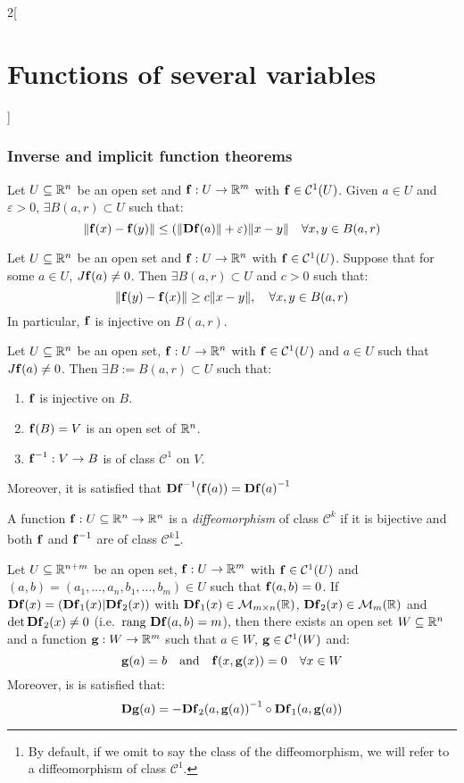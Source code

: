 \documentclass[../../../main_math.tex]{subfiles}
\begin{document}
\begin{multicols}{2}[\section{Functions of several variables}]
  \subsubsection{Inverse and implicit function theorems}
  \begin{lemma}
    Let $U\subseteq\mathbb{R}^n$ be an open set and $\boldsymbol{\mathrm{f}}:U\rightarrow\mathbb{R}^m$ with $\boldsymbol{\mathrm{f}}\in \mathcal{C}^1(U)$. Given $a\in U$ and $\varepsilon>0$, $\exists B(a,r)\subset U$ such that: $$\|\boldsymbol{\mathrm{f}}(x)-\boldsymbol{\mathrm{f}}(y)\|\leq(\|\boldsymbol{\mathrm{Df}}(a)\|+\varepsilon)\|x-y\|\quad\forall x,y\in B(a,r)$$
  \end{lemma}
  \begin{lemma}
    Let $U\subseteq\mathbb{R}^n$ be an open set and $\boldsymbol{\mathrm{f}}:U\rightarrow\mathbb{R}^n$ with $\boldsymbol{\mathrm{f}}\in \mathcal{C}^1(U)$. Suppose that for some $a\in U$, $J\boldsymbol{\mathrm{f}}(a)\ne 0$. Then $\exists B(a,r)\subset U$ and $c>0$ such that: $$\|\boldsymbol{\mathrm{f}}(y)-\boldsymbol{\mathrm{f}}(x)\|\geq c\|x-y\|,\quad\forall x,y\in B(a,r)$$ In particular, $\boldsymbol{\mathrm{f}}$ is injective on $B(a,r)$.
  \end{lemma}
  \begin{theorem}
    Let $U\subseteq\mathbb{R}^n$ be an open set, $\boldsymbol{\mathrm{f}}:U\rightarrow\mathbb{R}^n$ with $\boldsymbol{\mathrm{f}}\in \mathcal{C}^1(U)$ and $a\in U$ such that $J\boldsymbol{\mathrm{f}}(a)\ne0$. Then $\exists B:=B(a,r)\subset U$ such that:
    \begin{enumerate}
      \item $\boldsymbol{\mathrm{f}}$ is injective on $B$.
      \item $\boldsymbol{\mathrm{f}}(B)=V$ is an open set of $\mathbb{R}^n$.
      \item $\boldsymbol{\mathrm{f}}^{-1}:V\rightarrow B$ is of class $\mathcal{C}^1$ on $V$.
    \end{enumerate} Moreover, it is satisfied that $\boldsymbol{\mathrm{D}}{\boldsymbol{\mathrm{f}}}^{-1}(\boldsymbol{\mathrm{f}}(a))={\boldsymbol{\mathrm{Df}}(a)}^{-1}$
  \end{theorem}
  \begin{definition}
    A function $\boldsymbol{\mathrm{f}}:U\subseteq\mathbb{R}^n\rightarrow\mathbb{R}^n$ is a \emph{diffeomorphism} of class $\mathcal{C}^k$ if it is bijective and both $\boldsymbol{\mathrm{f}}$ and $\boldsymbol{\mathrm{f}}^{-1}$ are of class $\mathcal{C}^k$\footnote{By default, if we omit to say the class of the diffeomorphism, we will refer to a diffeomorphism of class $\mathcal{C}^1$.}.
  \end{definition}
  \begin{theorem}
    Let $U\subseteq\mathbb{R}^{n+m}$ be an open set, $\boldsymbol{\mathrm{f}}:U\rightarrow\mathbb{R}^m$ with $\boldsymbol{\mathrm{f}}\in \mathcal{C}^1(U)$ and $(a,b)=(a_1,\ldots,a_n,b_1,\ldots,b_m)\in U$ such that $\boldsymbol{\mathrm{f}}(a,b)=0$. If $\boldsymbol{\mathrm{D}}\boldsymbol{\mathrm{f}}(x)=(\boldsymbol{\mathrm{D}}\boldsymbol{\mathrm{f}}_1(x)|\boldsymbol{\mathrm{D}}\boldsymbol{\mathrm{f}}_2(x))$ with $\boldsymbol{\mathrm{D}}\boldsymbol{\mathrm{f}}_1(x)\in\mathcal{M}_{m\times n}(\mathbb{R} )$, $\boldsymbol{\mathrm{D}}\boldsymbol{\mathrm{f}}_2(x)\in\mathcal{M}_m(\mathbb{R} )$ and $\det \boldsymbol{\mathrm{Df}}_2(x)\ne 0$ (i.e.\ $\text{rang }\boldsymbol{\mathrm{Df}}(a,b)=m$), then there exists an open set $W\subseteq\mathbb{R}^n$ and a function $\boldsymbol{\mathrm{g}}:W\rightarrow\mathbb{R}^m$ such that $a\in W$, $\boldsymbol{\mathrm{g}}\in\mathcal{C}^1(W)$ and: $$\boldsymbol{\mathrm{g}}(a)=b\quad\text{and}\quad \boldsymbol{\mathrm{f}}(x,\boldsymbol{\mathrm{g}}(x))=0\quad\forall x\in W$$ Moreover, is is satisfied that: $$\boldsymbol{\mathrm{Dg}}(a)=-{\boldsymbol{\mathrm{Df}}_2(a,\boldsymbol{\mathrm{g}}(a))}^{-1}\circ \boldsymbol{\mathrm{Df}}_1(a,\boldsymbol{\mathrm{g}}(a))$$
  \end{theorem}

\end{multicols}
\end{document}
